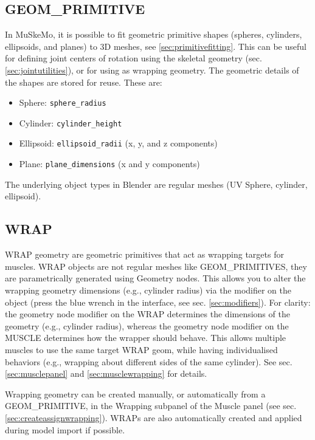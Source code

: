 \documentclass{article}
\begin{document}
\subsection{GEOM\_PRIMITIVE}

In MuSkeMo, it is possible to fit geometric primitive shapes (spheres, cylinders, ellipsoids, and planes) to 3D meshes, see \ref{sec:primitivefitting}. This can be useful for defining joint centers of rotation using the skeletal geometry (sec. \ref{sec:jointutilities}), or for using as wrapping geometry. The geometric details of the shapes are stored for reuse. These are:

\begin{itemize}
    \item Sphere: \texttt{sphere\_radius}
    \item Cylinder: \texttt{cylinder\_height}
    \item Ellipsoid: \texttt{ellipsoid\_radii} (x, y, and z components)
    \item Plane: \texttt{plane\_dimensions} (x and y components)
\end{itemize}

The underlying object types in Blender are regular meshes (UV Sphere, cylinder, ellipsoid).

\subsection{WRAP}
\label{sec:wrapgeom}

WRAP geometry are geometric primitives that act as wrapping targets for muscles. WRAP objects are not regular meshes like GEOM\_PRIMITIVES, they are parametrically generated using Geometry nodes. This allows you to alter the wrapping geometry dimensions (e.g., cylinder radius) via the modifier on the object (press the blue wrench in the interface, see sec. \ref{sec:modifiers}). For clarity: the geometry node modifier on the WRAP determines the dimensions of the geometry (e.g., cylinder radius), whereas the geometry node modifier on the MUSCLE determines how the wrapper should behave. This allows multiple muscles to use the same target WRAP geom, while having individualised behaviors (e.g., wrapping about different sides of the same cylinder). See sec. \ref{sec:musclepanel} and \ref{sec:musclewrapping} for details. 

Wrapping geometry can be created manually, or automatically from a GEOM\_PRIMITIVE, in the Wrapping subpanel of the Muscle panel (see sec. \ref{sec:createassignwrapping}). WRAPs are also automatically created and applied during model import if possible.
\end{document}
